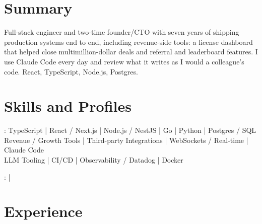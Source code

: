\documentclass[print]{jack-resume}
\begin{document}
\pagecolor{darkmodeBackground}


\begin{minipage}[t][1cm][t]{.03\textwidth}
    \hfill
\end{minipage}

\section{Summary}
Full-stack engineer and two-time founder/CTO with seven years of shipping production systems end to end, including revenue-side tools: a license dashboard that helped close multimillion-dollar deals and referral and leaderboard features. I use Claude Code every day and review what it writes as I would a colleague's code. React, TypeScript, Node.js, Postgres.
\sectionsep

\section{Skills and Profiles}
:
TypeScript \hfill | \hfill
React / Next.js \hfill | \hfill
Node.js / NestJS \hfill | \hfill
Go \hfill | \hfill
Python \hfill | \hfill
Postgres / SQL \\
\hspace{1.0cm} Revenue / Growth Tools \hfill | \hfill
Third-party Integrations \hfill | \hfill
WebSockets / Real-time \hfill | \hfill
Claude Code \\
\hspace{1.0cm} LLM Tooling \hfill | \hfill
CI/CD \hfill | \hfill
Observability / Datadog \hfill | \hfill
Docker \\

\raggedright{
    :
      \href{https://www.linkedin.com/in/jack-sturtevant/}{ \ExternalLink} |
     \href{https://github.com/jacksturt}{ \ExternalLink}}

\section{Experience}
\end{document}
